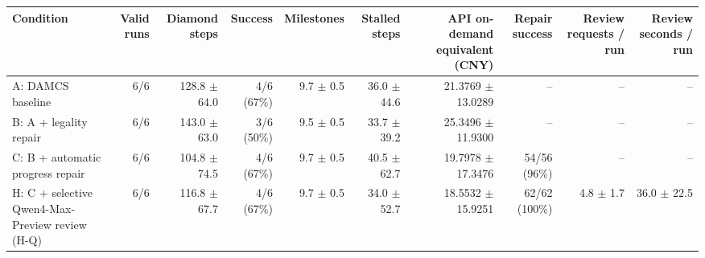 \begin{tabular}{lrrrrrrrrr}
\hline
Condition & Valid runs & Diamond steps & Success & Milestones & Stalled steps & API on-demand equivalent (CNY) & Repair success & Review requests / run & Review seconds / run \\
\hline
A: DAMCS baseline & 6/6 & 128.8 \(\pm\) 64.0 & 4/6 (67\%) & 9.7 \(\pm\) 0.5 & 36.0 \(\pm\) 44.6 & 21.3769 \(\pm\) 13.0289 & -- & -- & -- \\
B: A + legality repair & 6/6 & 143.0 \(\pm\) 63.0 & 3/6 (50\%) & 9.5 \(\pm\) 0.5 & 33.7 \(\pm\) 39.2 & 25.3496 \(\pm\) 11.9300 & -- & -- & -- \\
C: B + automatic progress repair & 6/6 & 104.8 \(\pm\) 74.5 & 4/6 (67\%) & 9.7 \(\pm\) 0.5 & 40.5 \(\pm\) 62.7 & 19.7978 \(\pm\) 17.3476 & 54/56 (96\%) & -- & -- \\
H: C + selective Qwen4-Max-Preview review (H-Q) & 6/6 & 116.8 \(\pm\) 67.7 & 4/6 (67\%) & 9.7 \(\pm\) 0.5 & 34.0 \(\pm\) 52.7 & 18.5532 \(\pm\) 15.9251 & 62/62 (100\%) & 4.8 \(\pm\) 1.7 & 36.0 \(\pm\) 22.5 \\
\hline
\end{tabular}
